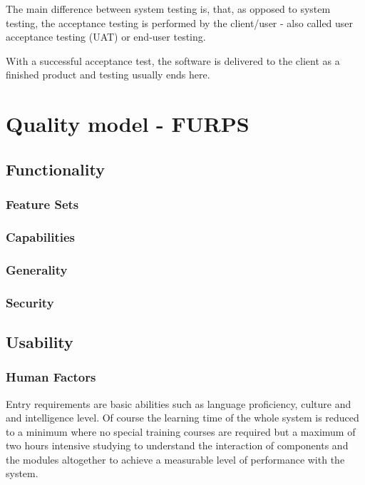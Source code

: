 \documentclass[11pt,a4paper,oneside,svgnames]{report}
\begin{document}
The main difference between system testing is, that, as opposed to system testing, the acceptance testing is performed by the client/user - also called user acceptance testing (UAT) or end-user testing.

With a successful acceptance test, the software is delivered to the client as a finished product and testing usually ends here.


\chapter{Quality model - FURPS}

\section{Functionality}

\subsection{Feature Sets}

\subsection{Capabilities}

\subsection{Generality}

\subsection{Security}

\section{Usability}

\subsection{Human Factors}
Entry requirements are basic abilities such as language proficiency, culture and and intelligence level. Of course the learning time of the whole system is reduced to a minimum where no special training courses are required but a maximum of two hours intensive studying to understand the interaction of components and the modules altogether to achieve a measurable level of performance with the system.
\end{document}
